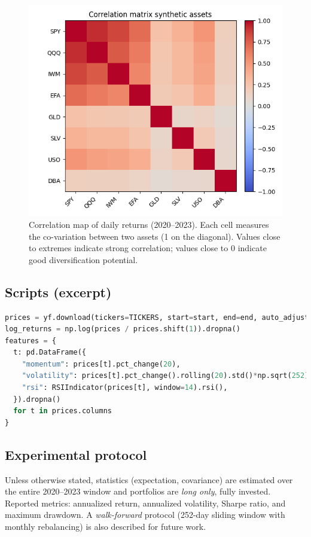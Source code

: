 \documentclass[11pt,a4paper]{article}
\begin{document}
\begin{figure}[h]
  \centering
  \includegraphics[width=0.7\linewidth]{../../figures/correlation_heatmap_generated.png}
  \caption{Correlation map of daily returns (2020--2023). Each cell measures the co-variation between two assets (1 on the diagonal). Values close to extremes indicate strong correlation; values close to 0 indicate good diversification potential.}
  \label{fig:corr_external}
\end{figure}

\subsection{Scripts (excerpt)}
\begin{lstlisting}[language=Python,caption={Download and preprocessing (excerpt)}]
prices = yf.download(tickers=TICKERS, start=start, end=end, auto_adjust=True)["Close"].dropna()
log_returns = np.log(prices / prices.shift(1)).dropna()
features = {
  t: pd.DataFrame({
    "momentum": prices[t].pct_change(20),
    "volatility": prices[t].pct_change().rolling(20).std()*np.sqrt(252),
    "rsi": RSIIndicator(prices[t], window=14).rsi(),
  }).dropna()
  for t in prices.columns
}
\end{lstlisting}

\subsection{Experimental protocol}
Unless otherwise stated, statistics (expectation, covariance) are estimated over the entire 2020--2023 window and portfolios are \emph{long only}, fully invested. Reported metrics: annualized return, annualized volatility, Sharpe ratio, and maximum drawdown. A \emph{walk-forward} protocol (252-day sliding window with monthly rebalancing) is also described for future work.
\end{document}
